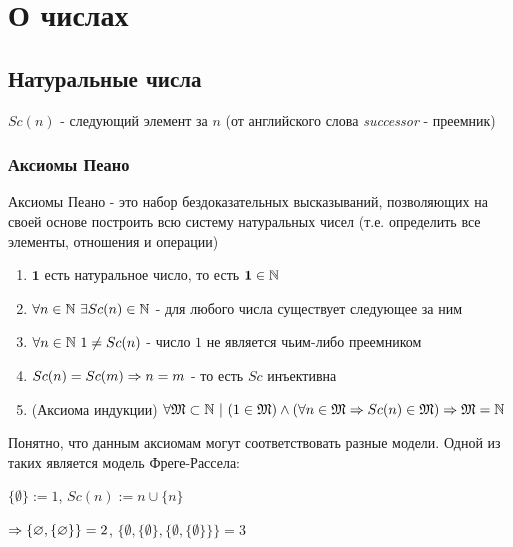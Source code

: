 \section{О числах}

\subsection{Натуральные числа}

\begin{definition}
    $Sc(n)$ - следующий элемент за $n$ (от английского слова \textit{successor} - преемник)
\end{definition}

\subsubsection*{Аксиомы Пеано}

\begin{definition}
    Аксиомы Пеано - это набор бездоказательных высказываний, позволяющих на своей основе построить всю систему натуральных чисел (т.е. определить все элементы, отношения и операции)
\end{definition}

\begin{enumerate}
    \item $\mathbf{1}$ есть натуральное число, то есть $\mathbf{1} \in \mathbb{N}$
    \item $\forall n \in \mathbb{N}\ \exists Sc(n) \in \mathbb{N}$ - для любого числа существует следующее за ним
    \item $\forall n \in \mathbb{N}\ 1 \neq Sc(n)$ - число $1$ не является чьим-либо преемником
    \item $Sc(n) = Sc(m) \Rightarrow n = m$ - то есть $Sc$ инъективна
    \item (Аксиома индукции) $\forall \mathfrak{M} \subset \mathbb{N}\ |\ (1 \in \mathfrak{M}) \wedge (\forall n \in \mathfrak{M} \Rightarrow Sc(n) \in \mathfrak{M}) \Rightarrow \mathfrak{M} = \mathbb{N}$
\end{enumerate}

\begin{example}
    Понятно, что данным аксиомам могут соответствовать разные модели. Одной из таких является модель Фреге-Рассела:
    
    $\{\emptyset\} := 1$, $Sc(n) := n \cup \{n\}$
    
    $\Rightarrow \{\varnothing, \{\varnothing\}\} = 2$, $\{\emptyset, \{\emptyset\}, \{\emptyset, \{\emptyset\}\}\} = 3$
\end{example}


